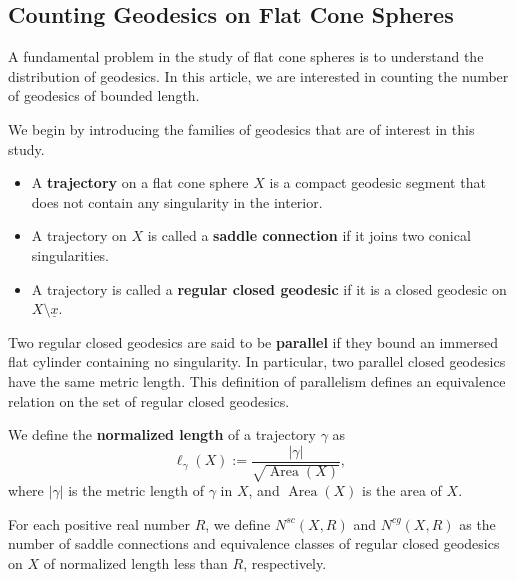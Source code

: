 \documentclass{compositio}
\numberwithin{equation}{section}
\numberwithin{figure}{section}
\theoremstyle{definition}
\theoremstyle{plain}
\begin{document}
\subsection{Counting Geodesics on Flat Cone Spheres}

A fundamental problem in the study of flat cone spheres is to understand the distribution of geodesics. In this article, we are interested in counting the number of geodesics of bounded length.

\smallskip


We begin by introducing the families of geodesics that are of interest in this study.

\begin{itemize}
    \item A \textbf{trajectory} on a flat cone sphere $X$ is a compact geodesic segment that does not contain any singularity in the interior.
    
    \item A trajectory on $X$ is called a \textbf{saddle connection} if it joins two conical singularities. 
    
    \item A trajectory is called a \textbf{regular closed geodesic} if it is a closed geodesic on $X\setminus\underline{x}$.
\end{itemize}

Two regular closed geodesics are said to be \textbf{parallel} if they bound an immersed flat cylinder containing no singularity. In particular, two parallel closed geodesics have the same metric length. This definition of parallelism defines an equivalence relation on the set of regular closed geodesics.

We define the \textbf{normalized length} of a trajectory $\gamma$ as 
$$\ell_\gamma(X) := \frac{|\gamma|}{\sqrt{\operatorname{Area}(X)}},$$
where $|\gamma|$ is the metric length of $\gamma$ in $X$, and $\operatorname{Area}(X)$ is the area of $X$.

For each positive real number $R$, we define $N^{sc}(X,R)$ and $N^{cg}(X,R)$
as the number of saddle connections and equivalence classes of regular closed geodesics on $X$ of normalized length less than $R$, respectively.

\smallskip
\end{document}
